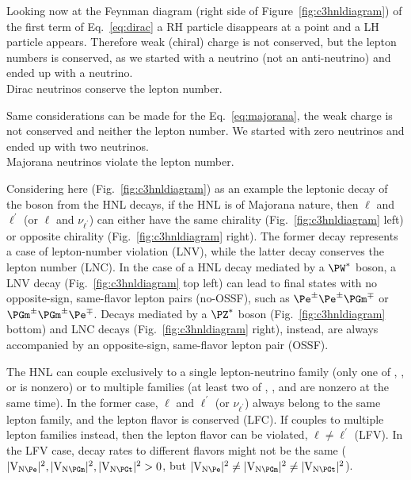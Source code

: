 Looking now at the Feynman diagram (right side of Figure~\ref{fig:c3hnldiagram}) of the first term of
Eq.~\ref{eq:dirac} a RH particle disappears at a point and a LH
particle appears. Therefore weak (chiral) charge is not conserved, but
the lepton numbers is conserved, as we started with a
neutrino (not an anti-neutrino) and ended up with a neutrino. \\
Dirac neutrinos conserve the lepton number.

Same considerations can be made for the Eq.~\ref{eq:majorana}, the
weak charge is not conserved and neither the lepton number. We started
with zero neutrinos and ended up with two neutrinos. \\
Majorana neutrinos violate the lepton number.

Considering here (Fig.~\ref{fig:c3hnldiagram}) as an example the leptonic decay of the \PW boson from the HNL decays, if the HNL is of Majorana nature, then $\ell$ and $\ell^\prime$ (or $\ell$
and $\nu_{\ell^\prime}$) can either have the same chirality
(Fig.~\ref{fig:c3hnldiagram} left) or opposite chirality
(Fig.~\ref{fig:c3hnldiagram} right). The former decay represents a case
of lepton-number violation (LNV), while the latter decay conserves the
lepton number (LNC).
In the case of a HNL decay mediated by a $\PW^\ast$ boson, a LNV decay
(Fig.~\ref{fig:c3hnldiagram} top left)
can lead to final states with no opposite-sign, same-flavor lepton
pairs (no-OSSF), such as $\Pe^\pm\Pe^\pm\PGm^\mp$ or
$\PGm^\pm\PGm^\pm\Pe^\mp$.
Decays mediated by a $\PZ^\ast$ boson (Fig.~\ref{fig:c3hnldiagram}
bottom) and LNC decays (Fig.~\ref{fig:c3hnldiagram} right), instead, are
always accompanied by an opposite-sign, same-flavor lepton pair
(OSSF).

The HNL can couple exclusively to a single lepton-neutrino family
(\ie only one of \mixpare, \mixparm, or \mixpart is nonzero)
or to multiple families (\ie at least two of \mixpare, \mixparm,
and \mixpart are nonzero at the same time).
In the former case, $\ell$ and $\ell^\prime$ (or
$\nu_{\ell^{\prime}}$) always belong to the same lepton family,
and the lepton flavor is conserved (LFC).
If \hnl couples to multiple lepton families instead, then the
lepton flavor can be violated, $\ell\neq\ell^\prime$ (LFV).
In the LFV case, decay rates to different flavors might not be the
same ($\mixpare,\mixparm,\mixpart>0$, but
$\mixpare\neq\mixparm\neq\mixpart$).


